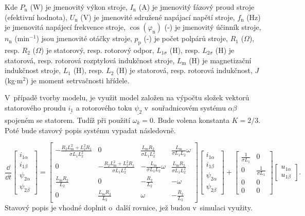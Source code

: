 \documentclass[a4paper, twoside, 11pt]{article}
\begin{document}
        \vspace*{1cm}
Kde $P_\text{n}$ (W) je jmenovitý výkon stroje, $I_\text{n}$ (A) je jmenovitý fázový proud stroje (efektivní hodnota), $U_\text{n}$ (V) je jmenovité sdružené napájací napětí stroje, $f_\text{n}$ (Hz) je jmenovitá napájecí frekvence stroje, $\cos(\varphi_\text{n})$ (-) je jmenovitý účinník stroje, $n_\text{n}$ (min$^{-1}$) jsou jmenovité otáčky stroje, $p_\text{p}$ (-) je počet polpárů stroje, $R_1$ ($\Omega$), resp. $R_2$ ($\Omega$) je statorový, resp. rotorový odpor, $L_{1\sigma}$ (H), resp. $L_{2\sigma}$ (H) je statorová, resp. rotorová rozptylová  indukčnost stroje, $L_\text{m}$ (H) je magnetizační indukčnost stroje, $L_1$ (H), resp. $L_2$ (H) je statorová, resp. rotorová indukčnost, $J$ (kg$\cdot$m$^{2}$) je moment setrvačnosti hřídele.\par
V~případě tvorby modelu, je využit model založen na výpočtu složek vektorů statorového proudu $\underline{i_1}$ a rotorového toku $\underline{\psi_2}$ v~souřadnicovém systému $\alpha\beta$ spojeném se statorem. Tudíž při použití $\omega_k = 0$. Bude volena konstanta $K = 2/3$. Poté bude stavový popis systému vypadat následovně.

\begin{equation}
    \frac{\dd{}}{\dd{t}}
    \begin{bmatrix}
        i_{1\alpha}\\
        i_{1\beta}\\
        \psi_{2\alpha}\\
        \psi_{2\beta}
    \end{bmatrix}
    =
    \begin{bmatrix}
        -\frac{R_2 L_\text{m}^{2} + L_2^2 R_1}{\sigma L_1 L_2^2} & 0 & \frac{L_\text{m} R_2}{\sigma L_1 L_2^2} & \frac{L_\text{m}}{\sigma L_1 L_2} \omega\\
        0 & - \frac{R_2 L_\text{m}^2 + L_2^2 R_1}{\sigma L_1 L_2^2} & - \frac{L_\text{m}}{\sigma L_1 L_2} \omega & \frac{L_\text{m} R_2}{\sigma L_1 L_2^2}\\
        \frac{L_\text{m} R_2}{L_2} & 0 & - \frac{R_2}{L_2} & -\omega\\
        0 & \frac{L_\text{m} R_2}{L_2} & \omega & -\frac{R_2}{L_2}
    \end{bmatrix}
    \begin{bmatrix}
        i_{1\alpha}\\
        i_{1\beta}\\
        \psi_{2\alpha}\\
        \psi_{2\beta}
    \end{bmatrix}
    +
    \begin{bmatrix}
        \frac{1}{\sigma L_1} & 0\\
        0 & \frac{1}{\sigma L_1}\\
        0 & 0\\
        0 & 0
    \end{bmatrix}
    \begin{bmatrix}
        u_{1\alpha}\\
        u_{1\beta}
    \end{bmatrix}.
\end{equation}
Stavový popis je vhodné doplnit o~další rovnice, jež budou v~simulaci využity.
\end{document}
